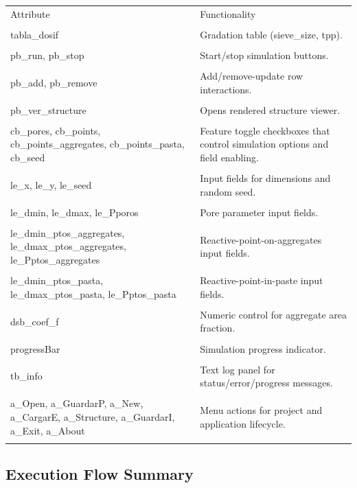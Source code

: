 ﻿\documentclass[11pt,a4paper]{article}
\begin{document}
\begin{longtable}{|p{}|p{}|}
\hline
Attribute & Functionality \\\\
\hline
tabla\_dosif & Gradation table (sieve\_size, tpp). \\\\
\hline
pb\_run, pb\_stop & Start/stop simulation buttons. \\\\
\hline
pb\_add, pb\_remove & Add/remove-update row interactions. \\\\
\hline
pb\_ver\_structure & Opens rendered structure viewer. \\\\
\hline
cb\_pores, cb\_points, cb\_points\_aggregates, cb\_points\_pasta, cb\_seed & Feature toggle checkboxes that control simulation options and field enabling. \\\\
\hline
le\_x, le\_y, le\_seed & Input fields for dimensions and random seed. \\\\
\hline
le\_dmin, le\_dmax, le\_Pporos & Pore parameter input fields. \\\\
\hline
le\_dmin\_ptos\_aggregates, le\_dmax\_ptos\_aggregates, le\_Pptos\_aggregates & Reactive-point-on-aggregates input fields. \\\\
\hline
le\_dmin\_ptos\_pasta, le\_dmax\_ptos\_pasta, le\_Pptos\_pasta & Reactive-point-in-paste input fields. \\\\
\hline
dsb\_coef\_f & Numeric control for aggregate area fraction. \\\\
\hline
progressBar & Simulation progress indicator. \\\\
\hline
tb\_info & Text log panel for status/error/progress messages. \\\\
\hline
a\_Open, a\_GuardarP, a\_New, a\_CargarE, a\_Structure, a\_GuardarI, a\_Exit, a\_About & Menu actions for project and application lifecycle. \\\\
\hline
\end{longtable}


\subsection*{Execution Flow Summary}
\end{document}
